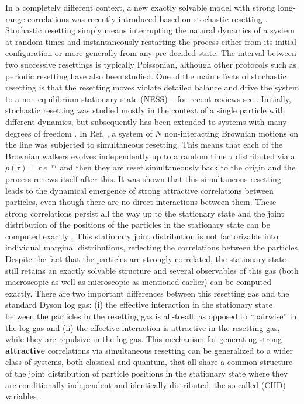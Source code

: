 \documentclass[onecolumn,superscriptaddress,
 amsmath,amssymb,
 aps,
 prd,
]{revtex4-1}
\begin{document}
In a completely different context, a new exactly solvable model with strong long-range correlations was recently introduced based on stochastic resetting \cite{BLMS23}. Stochastic resetting simply means interrupting the natural dynamics of a system at random times and instantaneously restarting the process either from its initial configuration or more generally from any pre-decided state. The interval between two successive resettings is typically Poissonian, although other protocols such as periodic resetting have also been studied. One of the main effects of stochastic resetting is that the resetting moves violate detailed balance and drive the system to
a non-equilibrium stationary state (NESS) \cite{EM11, EM11b} -- for recent reviews see \cite{EM20,PKR22,GJ22}. Initially, stochastic resetting was studied mostly in the context of a single particle with different dynamics, but subsequently has been extended to systems with many degrees of freedom \cite{GMS14,DHP14,BKP19,MMS20,NG23}. In Ref. \cite{BLMS23}, a system of $N$ non-interacting Brownian motions on the line was subjected to simultaneous resetting. This means that each of the Brownian walkers evolves independently up to a random time $\tau$ distributed via a $p(\tau) = r\, e^{-r\tau}$ and then they are reset simultaneously back to the origin and the process renews itself after this. It was shown that this simultaneous resetting leads to the dynamical emergence of strong attractive correlations between particles, even though there are no direct interactions between them. These strong correlations persist all the way up to the stationary state and the joint distribution of the positions of the particles in the stationary state can be computed exactly \cite{BLMS23}. This stationary joint distribution is not factorizable into individual marginal distributions, reflecting the correlations between the particles. 
Despite the fact that the particles are strongly correlated, the stationary state still retains an exactly solvable structure and several observables of this gas (both macroscopic as well as microscopic as mentioned earlier) can be computed exactly. There are two important differences between this resetting gas and the standard Dyson log gas: (i) the effective interaction in the stationary state between the particles in the resetting gas is all-to-all, as opposed to ``pairwise'' in the log-gas and (ii) the effective interaction is attractive in the resetting gas, while they are repulsive in the log-gas. This mechanism for generating strong {\bf attractive} correlations via simultaneous resetting can be generalized to a wider class of systems, both classical and quantum, 
that all share a common structure of the joint distribution of particle positions in the stationary state where they are conditionally independent and identically distributed, the so called (CIID) variables \cite{BLMS24,BKMS24,SM24, KMS24}. 
\end{document}
